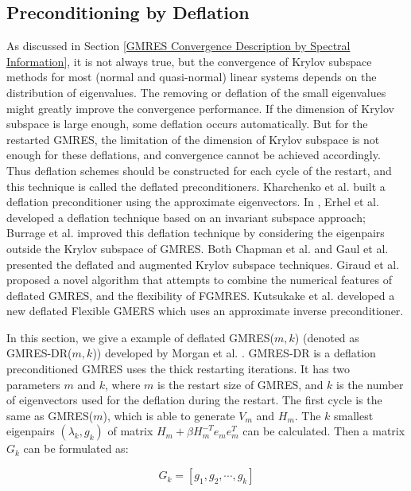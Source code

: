 {\subsection{Preconditioning by Deflation}

As discussed in Section \ref{GMRES Convergence Description by Spectral Information}, it is not always true, but the convergence of Krylov subspace methods for most (normal and quasi-normal) linear systems depends on the distribution of eigenvalues. The removing or deflation of the small eigenvalues might greatly improve the convergence performance. If the dimension of Krylov subspace is large enough, some deflation occurs automatically. But for the restarted GMRES, the limitation of the dimension of Krylov subspace is not enough for these deflations, and convergence cannot be achieved accordingly. Thus deflation schemes should be constructed for each cycle of the restart, and this technique is called the deflated preconditioners. Kharchenko et al. \cite{kharchenko1995eigenvalue} built a deflation preconditioner using the approximate eigenvectors. In \cite{erhel1996restarted}, Erhel et al. developed a deflation technique based on an invariant subspace approach; Burrage et al.  \cite{burrage1998deflation} improved this deflation technique by considering the eigenpairs outside the Krylov subspace of GMRES. Both Chapman et al. \cite{chapman1997deflated} and Gaul et al. \cite{gaul2013framework} presented the deflated and augmented Krylov subspace techniques. Giraud et al. \cite{giraud2010flexible} proposed a novel algorithm that attempts to combine the numerical features of deflated GMRES, and the flexibility of FGMRES. Kutsukake et al. \cite{kutsukake2015deflated} developed a new deflated Flexible GMERS which uses an approximate inverse preconditioner. 

In this section, we give a example of deflated GMRES($m,k$) (denoted as GMRES-DR($m,k$)) developed by Morgan et al. \cite{morgan2002gmres}. GMRES-DR is a deflation preconditioned GMRES uses the thick restarting iterations. It has two parameters $m$ and $k$, where $m$ is the restart size of GMRES, and $k$ is the number of eigenvectors used for the deflation during the restart. The first cycle is the same as GMRES($m$), which is able to generate $V_m$ and $H_m$. The $k$ smallest eigenpairs $(\lambda_k, g_k)$ of matrix $H_m+\beta H_m^{-T}e_me_m^T$ can be calculated. Then a matrix $G_k$ can be formulated as:

\begin{equation}
	 G_k=[g_1,g_2,\cdots,g_k]
\end{equation}

}
